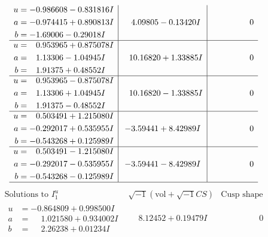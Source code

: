 \documentclass[1p]{elsarticle_modified}
\theoremstyle{definition}
\newcommand{\I}{\sqrt{-1}}
\begin{document}
$$\begin{array}{c|c|c}
\begin{aligned}
u &= -0.986608 - 0.831816 I \\
a &= -0.974415 + 0.890813 I \\
b &= -1.69006 - 0.29018 I\end{aligned}
 & \phantom{-}4.09805 - 0.13420 I & \phantom{-0.000000 } 0 \\ \hline\begin{aligned}
u &= \phantom{-}0.953965 + 0.875078 I \\
a &= \phantom{-}1.13306 - 1.04945 I \\
b &= \phantom{-}1.91375 + 0.48552 I\end{aligned}
 & \phantom{-}10.16820 + 1.33885 I & \phantom{-0.000000 } 0 \\ \hline\begin{aligned}
u &= \phantom{-}0.953965 - 0.875078 I \\
a &= \phantom{-}1.13306 + 1.04945 I \\
b &= \phantom{-}1.91375 - 0.48552 I\end{aligned}
 & \phantom{-}10.16820 - 1.33885 I & \phantom{-0.000000 } 0 \\ \hline\begin{aligned}
u &= \phantom{-}0.503491 + 1.215080 I \\
a &= -0.292017 + 0.535955 I \\
b &= -0.543268 + 0.125989 I\end{aligned}
 & -3.59441 + 8.42989 I & \phantom{-0.000000 } 0 \\ \hline\begin{aligned}
u &= \phantom{-}0.503491 - 1.215080 I \\
a &= -0.292017 - 0.535955 I \\
b &= -0.543268 - 0.125989 I\end{aligned}
 & -3.59441 - 8.42989 I & \phantom{-0.000000 } 0\\
 \hline 
 \end{array}$$\newpage$$\begin{array}{c|c|c}  
\text{Solutions to }I^u_{1}& \I (\text{vol} + \sqrt{-1}CS) & \text{Cusp shape}\\
 \hline 
\begin{aligned}
u &= -0.864809 + 0.998500 I \\
a &= \phantom{-}1.021580 + 0.934002 I \\
b &= \phantom{-}2.26238 + 0.01234 I\end{aligned}
 & \phantom{-}8.12452 + 0.19479 I & \phantom{-0.000000 } 0 \\ \hline\begin{aligned}

\end{aligned}
\end{array}$$
\end{document}
